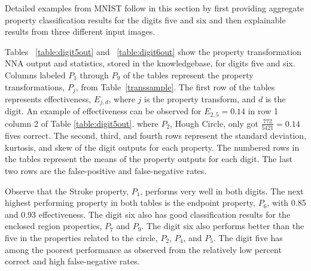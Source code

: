 \documentclass[conference]{IEEEtran}
\begin{document}
Detailed examples from MNIST follow in this section by first providing aggregate property classification results for the digits five and six and then explainable results from three different input images.

Tables ~\ref{table:digit5out} and ~\ref{table:digit6out} show the property transformation NNA output and statistics, stored in the knowledgebase, for digits five and six.  Columns labeled $P_1$ through $P_9$ of the tables represent the property transformations, $P_j$, from Table~\ref{transsample}.  The first row of the tables represents effectiveness, $E_{j,d}$, where $j$ is the property transform, and $d$ is the digit.  An example of effectiveness can be observed for $E_{2,5}=0.14$ in row 1 column 2 of Table \ref{table:digit5out}. where $P_2$, Hough Circle, only got $\frac{772}{5421}=0.14$ fives correct.   The second, third, and fourth rows represent the standard deviation, kurtosis, and skew of the digit outputs for each property.  The numbered rows in the tables represent the means of the property outputs for each digit.  The last two rows are the false-positive and false-negative rates.

Observe that the Stroke property, $P_1$, performs very well in both digits.  The next highest performing property in both tables is the endpoint property, $P_6$, with 0.85 and 0.93 effectiveness.  The digit six also has good classification results for the enclosed region properties, $P_7$ and $P_9$.  The digit six also performs better than the five in the properties related to the circle, $P_2$, $P_4$, and $P_5$.  The digit five has among the poorest performance as observed from the relatively low percent correct and high false-negative rates.
\end{document}
